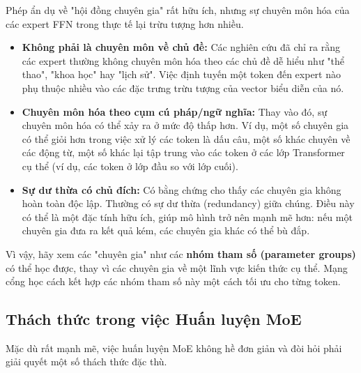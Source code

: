 \begin{tcolorbox}[
    title={Các "Chuyên gia" có thực sự chuyên môn hóa không?},
    colback=blue!5!white, colframe=blue!75!black, fonttitle=\bfseries
]
Phép ẩn dụ về "hội đồng chuyên gia" rất hữu ích, nhưng sự chuyên môn hóa của các expert FFN trong thực tế lại trừu tượng hơn nhiều.
\begin{itemize}
    \item \textbf{Không phải là chuyên môn về chủ đề:} Các nghiên cứu đã chỉ ra rằng các expert thường không chuyên môn hóa theo các chủ đề dễ hiểu như "thể thao", "khoa học" hay "lịch sử". Việc định tuyến một token đến expert nào phụ thuộc nhiều vào các đặc trưng trừu tượng của vector biểu diễn của nó.
    \item \textbf{Chuyên môn hóa theo cụm cú pháp/ngữ nghĩa:} Thay vào đó, sự chuyên môn hóa có thể xảy ra ở mức độ thấp hơn. Ví dụ, một số chuyên gia có thể giỏi hơn trong việc xử lý các token là dấu câu, một số khác chuyên về các động từ, một số khác lại tập trung vào các token ở các lớp Transformer cụ thể (ví dụ, các token ở lớp đầu so với lớp cuối).
    \item \textbf{Sự dư thừa có chủ đích:} Có bằng chứng cho thấy các chuyên gia không hoàn toàn độc lập. Thường có sự dư thừa (redundancy) giữa chúng. Điều này có thể là một đặc tính hữu ích, giúp mô hình trở nên mạnh mẽ hơn: nếu một chuyên gia đưa ra kết quả kém, các chuyên gia khác có thể bù đắp.
\end{itemize}
Vì vậy, hãy xem các "chuyên gia" như các \textbf{nhóm tham số (parameter groups)} có thể học được, thay vì các chuyên gia về một lĩnh vực kiến thức cụ thể. Mạng cổng học cách kết hợp các nhóm tham số này một cách tối ưu cho từng token.
\end{tcolorbox}
\subsection{Thách thức trong việc Huấn luyện MoE}
\label{ssec:moe_training_challenges}

Mặc dù rất mạnh mẽ, việc huấn luyện MoE không hề đơn giản và đòi hỏi phải giải quyết một số thách thức đặc thù.

